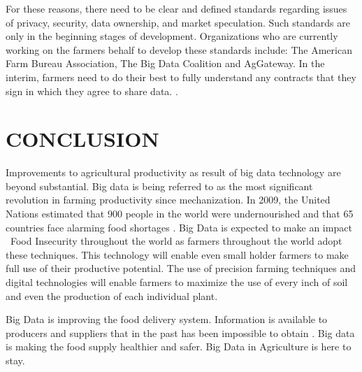 \documentclass[sigconf]{acmart}
\begin{document}
For these reasons, there need to be clear and defined standards regarding issues of privacy, security, data ownership, and market speculation. Such standards are only in the beginning stages of development. Organizations who are currently working on the farmers behalf to develop these standards include: The American Farm Bureau Association, The Big Data Coalition and AgGateway. In the interim, farmers need to do their best to fully understand any contracts that they sign in which they agree to share data.   \cite{Wolfert}.

\section{CONCLUSION}

Improvements to agricultural productivity as result of big data technology are beyond substantial.  Big data is being referred to as the most significant revolution in farming productivity since mechanization.  In 2009, the United Nations estimated that 900 people in the world were undernourished and that 65 countries face alarming food shortages \cite{DevEcon}. Big Data is expected to make an impact \ Food Insecurity throughout the world as farmers throughout the world adopt these techniques. This technology will enable even small holder farmers to make full use of their productive potential. The use of precision farming techniques and digital technologies will enable farmers to maximize the use of every inch of soil and even the production of each individual plant.

Big Data is improving the food delivery system. Information is available to producers and suppliers that in the past has been impossible to obtain \cite{Wolfert}. Big data is making the food supply healthier and safer. Big Data in Agriculture is here to stay. 





 


\end{document}
